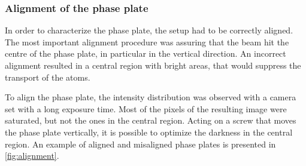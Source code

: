 \subsubsection{Alignment of the phase plate}
In order to characterize the phase plate, the setup had to be correctly aligned. The most important alignment procedure was assuring that the beam hit the centre of the phase plate, in particular in the vertical direction. An incorrect alignment resulted in a central region with bright areas, that would suppress the transport of the atoms.

To align the phase plate, the intensity distribution was observed with a camera set with a long exposure time. Most of the pixels of the resulting image were saturated, but not the ones in the central region. Acting on a screw that moves the phase plate vertically, it is possible to optimize the darkness in the central region. An example of aligned and misaligned phase plates is presented in \cref{fig:alignment}.
